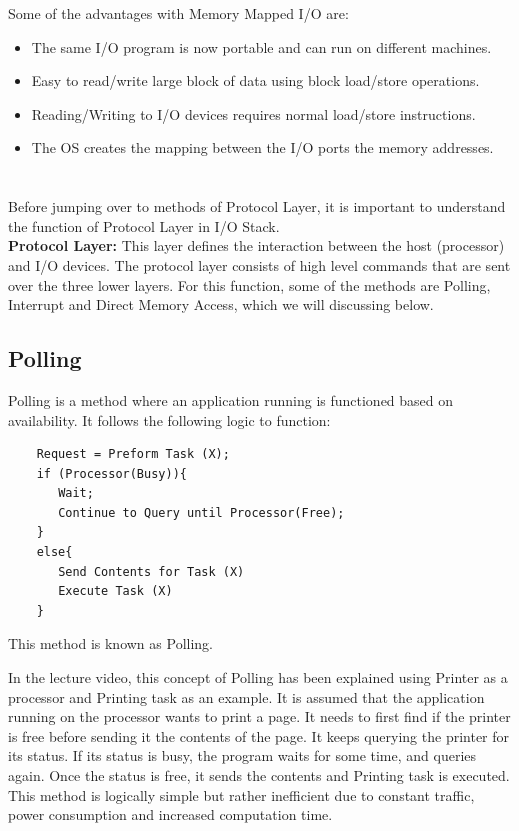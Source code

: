 \documentclass[12pt]{article}
\begin{document}
Some of the advantages with Memory Mapped I/O are:
\begin{itemize}
    \item The same I/O program is now portable and can run on different machines.
    \item Easy to read/write large block of data using block load/store operations.
    \item Reading/Writing to I/O devices requires normal load/store instructions.
    \item The OS creates the mapping between the I/O ports the memory addresses.
\end{itemize}


\section{}
Before jumping over to methods of Protocol Layer, it is important to understand the function of Protocol Layer in I/O Stack. \\

\textbf{Protocol Layer:} This layer defines the interaction between the host (processor) and I/O devices. The protocol layer consists of high level commands that are sent over the three lower layers. For this function, some of the methods are Polling, Interrupt and Direct Memory Access, which we will discussing below.

\subsection{Polling}
Polling is a method where an application running is functioned based on availability. It follows the following logic to function:
\begin{verbatim}
    Request = Preform Task (X);
    if (Processor(Busy)){
       Wait;
       Continue to Query until Processor(Free);
    }
    else{
       Send Contents for Task (X)
       Execute Task (X)
    }
\end{verbatim}
This method is known as Polling.

In the lecture video, this concept of Polling has been explained using Printer as a processor and Printing task as an example. It is assumed that the application running on the processor wants to print a page. It needs to first find if the printer is free before sending it the contents of the page. It keeps querying the printer for its status. If its status is busy, the program waits for some time, and queries again. Once the status is free, it sends the contents and Printing task is executed. This method is logically simple but rather inefficient due to constant traffic, power consumption and increased computation time. \\
\end{document}
